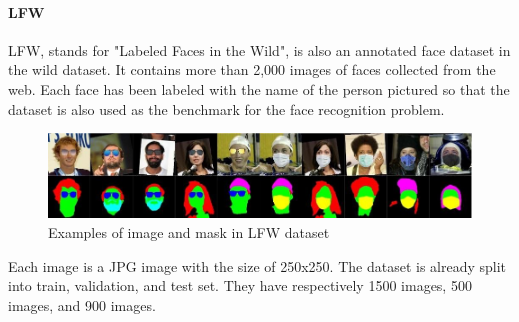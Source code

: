 \paragraph{LFW}
LFW,  stands for "Labeled Faces in the Wild", is also an annotated face dataset in the wild dataset. It contains more than 2,000 images of faces collected from the web. Each face has been labeled with the name of the person pictured so that the dataset is also used as the benchmark for the face recognition problem.

\begin{figure} [H]
    \centering
    \includegraphics{chapter4/image/lfw.png}
    \caption{Examples of image and mask in LFW dataset}
    \label{fig:lfw}
\end{figure}

Each image is a JPG image with the size of 250x250. The dataset is already split into train, validation, and test set. They have respectively 1500 images, 500 images, and 900 images.